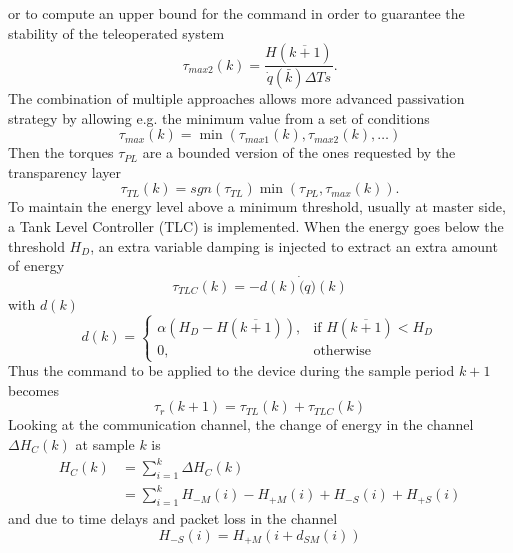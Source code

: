 or to compute an upper bound for the command in order to guarantee the stability of the teleoperated system
\begin{equation*}
	\tau_{max2}(k) = \dfrac{H (\overline{k+1})}{\dot{q}(\bar{k}) \Delta Ts}.
\end{equation*}
The combination of multiple approaches allows more advanced passivation strategy by allowing e.g. the minimum value from a set of conditions
\begin{equation*}
	\tau_{max}(k) = \min(\tau_{max1}(k),\tau_{max2}(k),\dots)
\end{equation*}
Then the torques $\tau_{PL}$ are a bounded version of the ones requested by the transparency layer
\begin{equation}\label{tau_TL}
\tau_{TL}(k) = sgn(\tau_{TL}) \min(\tau_{PL},\tau_{max}(k)).
\end{equation}
To maintain the energy level above a minimum threshold, usually at master side, a Tank Level Controller (TLC) is implemented.
When the energy goes below the threshold $H_{D}$, an extra variable damping is injected to extract an extra amount of energy
\begin{equation}
	\tau_{TLC}(k) = -d(k)\dot(q)(k)
\end{equation}
with $d(k)$
\begin{equation}
		d(k) = 
		\begin{cases}
			\alpha(H_{D} - H(\overline{k+1})), & \mbox{if } H(\overline{k+1})  < H_{D}\\
			0, & \mbox{otherwise}
		\end{cases}
\end{equation}
Thus the command to be applied to the device during the sample period $k+1$ becomes
\begin{equation}
\tau_{r}(k+1) = \tau_{TL}(k) + \tau_{TLC}(k)
\end{equation}
Looking at the communication channel, the change of energy in the channel $\Delta H_{C}(k)$ at sample $k$ is
\begin{equation}
	\begin{split}
		H_{C}(k) & = \sum_{i=1}^{k} \Delta H_{C}(k)\\
		& = \sum_{i=1}^{k} H_{-M}(i) - H_{+M}(i) + H_{-S}(i) + H_{+S}(i) 
	\end{split}
\end{equation}
and due to time delays and packet loss in the channel 
\begin{equation*}
	H_{-S}(i) = H_{+M}(i+d_{SM}(i))
\end{equation*}
